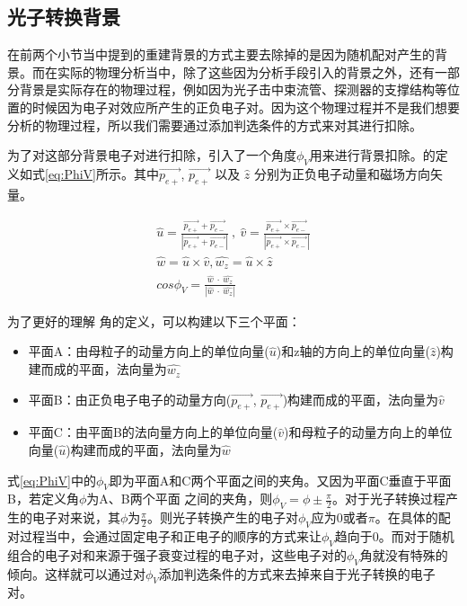 \subsection{光子转换背景}
\label{chap:photon_conversion}
在前两个小节当中提到的重建背景的方式主要去除掉的是因为随机配对产生的背景。而在实际的物理分析当中，除了这些因为分析手段引入的背景之外，还有一部分背景是实际存在的物理过程，例如因为光子击中束流管、探测器的支撑结构等位置的时候因为电子对效应所产生的正负电子对。因为这个物理过程并不是我们想要分析的物理过程，所以我们需要通过添加判选条件的方式来对其进行扣除。

为了对这部分背景电子对进行扣除，引入了一个角度$\phi_V$用来进行背景扣除。\PhiV 的定义如式\ref{eq:PhiV}所示。其中$\vec{p_{e+}}$, $\vec{p_{e+}}$ 以及 $\hat{z}$ 分别为正负电子动量和磁场方向矢量。

\begin{equation}
  \begin{split}
      \hat{u} = \frac{ \vec{p_{e+}} + \vec{p_{e-}} }{ |\vec{p_{e+}} + \vec{p_{e-}}| } ~,~ \hat{v} = \frac{ \vec{p_{e+}} \times \vec{p_{e-}} }{ |\vec{p_{e+}} \times \vec{p_{e-}}| }\\
      \hat{w} = \hat{u} \times \hat{v}, \hat{w_z} = \hat{u} \times \hat{z}\\
      cos\phi_V = \frac{\hat{w}~\cdot~\hat{w_z}}{|\hat{w}~\cdot~\hat{w_z}|}
  \end{split}
  \label{eq:PhiV}
\end{equation}

为了更好的理解 \PhiV 角的定义，可以构建以下三个平面：
\begin{itemize}
  \item 平面A：由母粒子的动量方向上的单位向量($\hat{u}$)和z轴的方向上的单位向量($\hat{z}$)构建而成的平面，法向量为$\hat{w_z}$
  \item 平面B：由正负电子电子的动量方向($\vec{p_{e+}}$, $\vec{p_{e+}}$)构建而成的平面，法向量为$\hat{v}$
  \item 平面C：由平面B的法向量方向上的单位向量($\hat{v}$)和母粒子的动量方向上的单位向量($\hat{u}$)构建而成的平面，法向量为$\hat{w}$
\end{itemize}

式\ref{eq:PhiV}中的$\phi_V$即为平面A和C两个平面之间的夹角。又因为平面C垂直于平面B，若定义角$\phi$为A、B两个平面 之间的夹角，则$\phi_V = \phi \pm \frac{\pi}{2}$。对于光子转换过程产生的电子对来说，其$\phi$为$\frac{\pi}{2}$。则光子转换产生的电子对$\phi_V$应为0或者$\pi$。在具体的配对过程当中，会通过固定电子和正电子的顺序的方式来让$\phi_V$趋向于0。而对于随机组合的电子对和来源于强子衰变过程的电子对，这些电子对的$\phi_V$角就没有特殊的倾向。这样就可以通过对$\phi_V$添加判选条件的方式来去掉来自于光子转换的电子对。

